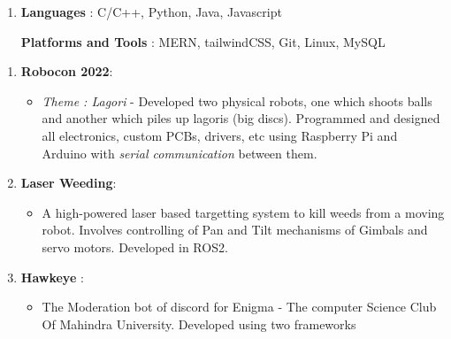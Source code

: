 \documentclass[a4paper, oneside, 12pt]{article}
\makeatletter
\def\vhrulefill#1{\leavevmode\leaders\hrule\@height#1\hfill \kern\z@}
\makeatother
\begin{document}
\begin{enumerate}[label = , topsep = 0pt, partopsep = 0pt]
  \item
        \color{black}
        \textbf{Languages }: C/C++, Python, Java, Javascript

        \textbf{Platforms and Tools }: MERN, tailwindCSS, Git, Linux, MySQL
\end{enumerate}

\vspace{3mm}

\color[HTML]{0F00FF}{\normalsize  Selected Projects}  \color{gray}{\vhrulefill{1.5pt}}
\footnotesize

\vspace{2mm}
\color{black}
\begin{enumerate}[label =, itemsep = 2mm, topsep = 0pt, partopsep = 0pt]

  \item
        \textbf{Robocon 2022}:
        \begin{itemize}[label = - , topsep = 0pt, partopsep = 0pt]
          \item \textit{Theme : Lagori} - Developed two physical robots, one which shoots balls and another which piles up lagoris (big discs). Programmed and designed all electronics, custom PCBs, drivers, etc using Raspberry Pi and Arduino with \textit{serial communication} between them.
        \end{itemize}

  \item
        \textbf{Laser Weeding}:
        \begin{itemize}[label = - , topsep = 0pt, partopsep = 0pt]
          \item A high-powered laser based targetting system to kill weeds from a moving robot. Involves controlling of Pan and Tilt mechanisms of Gimbals and servo motors. Developed in ROS2.
        \end{itemize}

  \item
        \textbf{Hawkeye }:
        \begin{itemize}[label = - , topsep = 0pt, partopsep = 0pt]
          \item The Moderation bot of discord for Enigma - The computer Science Club Of Mahindra University. Developed using two frameworks
        \end{itemize}


\end{enumerate}
\end{document}
